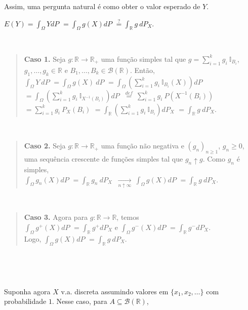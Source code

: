 \documentclass[
]{book}
\begin{document}
Assim, uma pergunta natural é como obter o valor esperado de \(Y\).

\(E(Y) = \displaystyle\int_\Omega YdP\) \(=\displaystyle\int_\Omega g(X)dP\) \(\overset{?}{=} \displaystyle\int_{\mathbb{R}}g~dP_X\).

\(~\)

\begin{quote}
\textbf{Caso 1.} Seja \(g:\mathbb{R}\longrightarrow\mathbb{R}_+\) uma função simples tal que \(g = \sum_{i=1}^kg_i~\mathbb{I}_{B_i}\), \(g_1,\ldots,g_k \in \mathbb{R}\) e \(B_1,\ldots,B_k \in \mathcal{B}(\mathbb{R})\). Então,\\
\(\displaystyle\int_\Omega Y~dP\)
\(=\displaystyle\int_\Omega g(X)~dP\)
\(=\displaystyle\int_\Omega \left(\sum_{i=1}^k g_i ~\mathbb{I}_{B_i}(X)\right)dP\)
\(=\displaystyle\int_\Omega \left(\sum_{i=1}^k g_i ~\mathbb{I}_{X^{-1}(B_i)}\right)dP\)
\(~\displaystyle\overset{def}{=}~\sum_{i=1}^k g_i~P(X^{-1}(B_i))\)
\(=\displaystyle\sum_{i=1}^k g_i~P_X(B_i)\)
\(=\displaystyle\int_{\mathbb{R}}\left(\sum_{i=1}^kg_i~\mathbb{I}_{B_i}\right)dP_X\)
\(=\displaystyle\int_{\mathbb{R}} g~dP_X\).
\end{quote}

\(~\)

\begin{quote}
\textbf{Caso 2.} Seja \(g:\mathbb{R}\longrightarrow\mathbb{R}_+\) uma função não negativa e \((g_n)_{n\geq1}\), \(g_n \geq 0\), uma sequência crescente de funções simples tal que \(g_n\uparrow g\). Como \(g_n\) é simples,\\
\(\displaystyle\int_\Omega g_n(X)dP\) \(=\displaystyle\int_{\mathbb{R}}g_n~dP_X\) \(\displaystyle~\underset{n\uparrow\infty}{\longrightarrow}~ \int_\Omega g(X)dP\) \(=\displaystyle\int_{\mathbb{R}}g~dP_X\).
\end{quote}

\(~\)

\begin{quote}
\textbf{Caso 3.} Agora para \(g: \mathbb{R} \longrightarrow \mathbb{R}\), temos\\
\(\displaystyle\int_\Omega g^+(X)dP\) \(=\displaystyle\int_{\mathbb{R}}g^+dP_X\) e \(\displaystyle\int_\Omega g^-(X)dP\) \(=\displaystyle\int_{\mathbb{R}}g^-dP_X\).\\
Logo, \(\displaystyle\int_\Omega g(X)dP\) \(=\displaystyle\int_{\mathbb{R}}g~dP_X\).
\end{quote}

\(~\)

\(~\)

Suponha agora \(X\) v.a. discreta assumindo valores em \(\{x_1,x_2,\ldots\}\) com probabilidade \(1\). Nesse caso, para \(A\subseteq\mathcal{B}(\mathbb{R})\),
\end{document}

